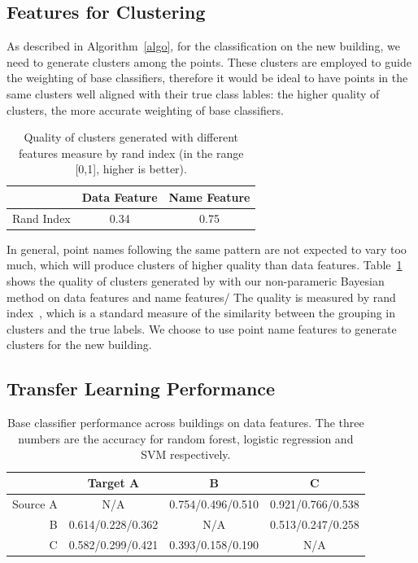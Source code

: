 \subsection{Features for Clustering}
As described in Algorithm~\ref{algo}, for the classification on the new building, we need to generate clusters among the points.
These clusters are employed to guide the weighting of base classifiers, therefore it would be ideal to have points in the same clusters well aligned with their true class lables: the higher quality of clusters, the more accurate weighting of base classifiers.


\begin{table}[h]
\centering
\begin{tabular}{l|c|c}
\hline
                & Data Feature & Name Feature \\ \hline
Rand Index & 0.34       & 0.75       \\ \hline
\end{tabular}
\caption{Quality of clusters generated with different features measure by rand index (in the range [0,1], higher is better).}
\label{quality}
\end{table}


In general, point names following the same pattern are not expected to vary too much, which will produce clusters of higher quality than data features.
Table~\ref{quality} shows the quality of clusters generated by with our non-parameric Bayesian method on data features and name features/ The quality is measured by rand index~\cite{rand}, which is a standard measure of the similarity between the grouping in clusters and the true labels.
We choose to use point name features to generate clusters for the new building. 


\subsection{Transfer Learning Performance}
\begin{table}[]
\centering
\begin{tabular}{r|c|c|c}
\hline
 & Target A     & B     & C     \\ \hline
Source A & N/A   & 0.754/0.496/0.510 & 0.921/0.766/0.538 \\ \hline
B & 0.614/0.228/0.362 & N/A   & 0.513/0.247/0.258 \\ \hline
C & 0.582/0.299/0.421 & 0.393/0.158/0.190 & N/A   \\ \hline
\end{tabular}
\caption{Base classifier performance across buildings on data features. The three numbers are the accuracy for random forest, logistic regression and SVM respectively.}
\label{acc_base}
\end{table}


